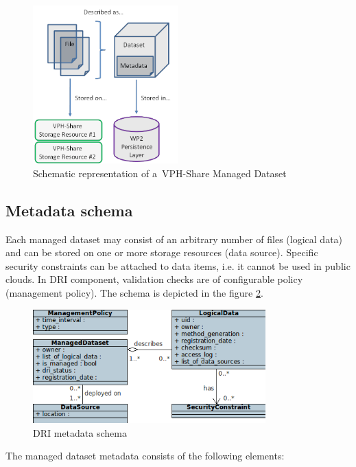 \begin{figure}[h!]
	\centering
	\includegraphics[width=0.5\textwidth]{images/managed-dataset.png}
	\caption{Schematic representation of a~VPH-Share Managed Dataset}
	\label{fig:managed-dataset}
\end{figure}

		\subsection{Metadata schema}
Each managed dataset may consist of an arbitrary number of files (logical 
data) and can be stored on one or more storage resources (data source).
Specific security constraints can be attached to data items, i.e. it cannot be
used in public clouds. In DRI component, validation checks are of configurable
policy (management policy). The schema is depicted in the figure 
\ref{fig:data-model}.\\

\begin{figure}[h!]
	\centering
	\includegraphics[width=0.8\textwidth]{images/data-model.png}
	\caption{DRI metadata schema}
	\label{fig:data-model}
\end{figure}

The managed dataset metadata consists of the following elements:

